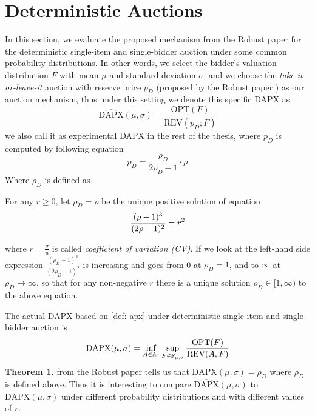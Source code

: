 \chapter{Deterministic Auctions}
\label{ch:DAPX}
In this section, we evaluate the proposed mechanism from the Robust paper \cite{giannakopoulos2020robust} for the deterministic single-item and single-bidder auction under some common probability distributions. In other words, we select the bidder's valuation distribution $F$ with mean $\mu$ and standard deviation $\sigma$, and we choose the \textit{take-it-or-leave-it} auction with reserve price $p_D$ (proposed by the Robust paper \cite{giannakopoulos2020robust}) as our auction mechanism, thus under this setting we denote this specific DAPX as
\begin{equation}
\label{exp: dapx}
   \widehat{\text{DAPX}}(\mu,\sigma) = \frac{\text{OPT}(F)}{\text{REV}(p_D;F)}
\end{equation}
we also call it as experimental DAPX in the rest of the thesis, where $p_D$ is computed by following equation
\begin{equation}
\label{equation:rhoD}
	p_D =  \frac{\rho_{D}}{2\rho_{D}-1} \cdot \mu
\end{equation}
Where $\rho_{D}$ is defined as
\begin{definition}
	\label{definition:functionD}
	For any $r \geqslant 0$, let $\rho_D = \rho$ be the unique positive solution of equation
	\begin{equation}\notag
	\frac{(\rho - 1)^3}{(2\rho - 1)^2} = r^2
	\end{equation}
\end{definition}
where $r = \frac{\sigma}{u}$ is called \textit{coefficient of variation (CV)}. If we look at the left-hand side expression $\frac {(\rho_{D}-1)^{3}}{(2\rho_{D}-1)^{2}}$ is increasing and goes from 0 at $\rho_{D} = 1$, and to $\infty$ at $\rho_{D} \rightarrow \infty$, so that for any non-negative $r$ there is a unique solution $\rho_{D} \in [1,\infty)$ to the above equation. 

The actual DAPX based on \cref{def: apx} under deterministic single-item and single-bidder auction is
\begin{equation}\notag
    \text{DAPX}(\mu,\sigma) = \inf_{A\in \mathbb{A}_1}  \sup_{F\in \mathbb{F}_{\mu, \sigma}} \frac{\text{OPT}(F)}{\text{REV}(A,F)}
\end{equation}
\textbf{Theorem 1.} from the Robust paper \cite{giannakopoulos2020robust} tells us that $\text{DAPX}(\mu,\sigma)  = \rho_D$ where $\rho_D$ is defined above. Thus it is interesting to compare $\widehat{\text{DAPX}}(\mu,\sigma)$ to $ \text{DAPX}(\mu,\sigma)$ under different probability distributions and with different values of $r$. 

